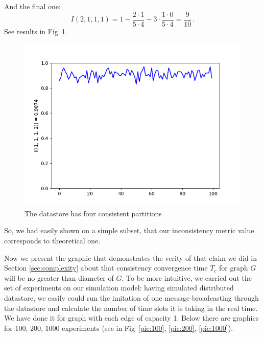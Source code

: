 \documentclass{llncs}
\begin{document}
%
And the final one:
\[
	I(2,1,1,1) = 1 - \frac{2 \cdot 1}{5 \cdot 4} - 3\cdot\frac{1 \cdot 0}{5 \cdot 4} = \frac{9}{10}\,.
\]
See results in Fig~\ref{pic:four_parts}.
\begin{figure}
\centering\includegraphics[scale=0.4]{images/1-1-1-2-consistent-partitions-probability.png}
\caption{The datastore has four consistent partitions}\label{pic:four_parts}
\end{figure}
%
So, we had easily shown on a simple subset, that our inconsistency metric value corresponds to theoretical one.

Now we present the graphic that demonstrates the verity of that claim we did in Section \ref{sec:complexity} about that consistency convergence time $T_c$ for graph $G$ will be no greater than diameter of $G$.
To be more intuitive, we carried out the set of experiments on our simulation model: having simulated distributed datastore, we easily could run the imitation of one message broadcasting through the datastore and calculate the number of time slots it is taking in the real time. We have done it for graph with each edge of capacity 1. Below there are graphics for 100, 200, 1000 experiments (see in Fig~\ref{pic:100}, \ref{pic:200}, \ref{pic:1000}).
\end{document}
